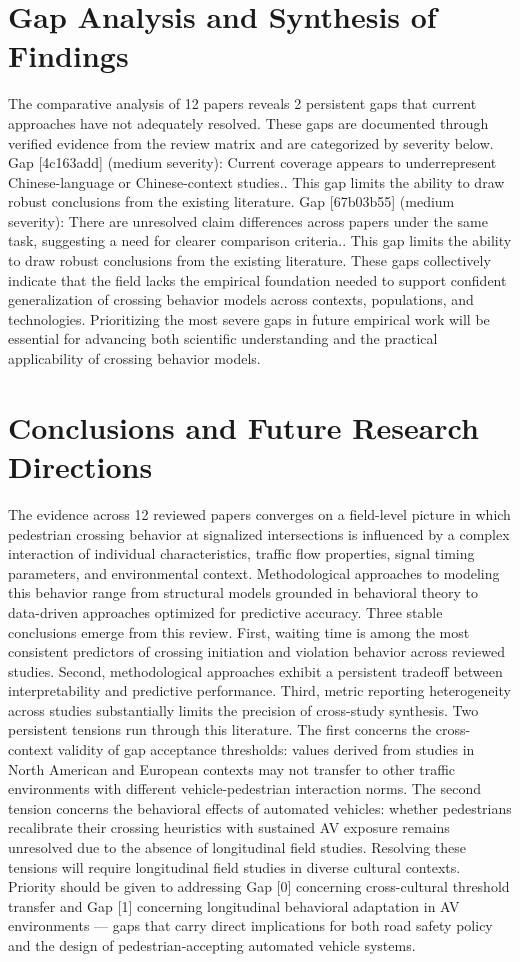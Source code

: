 \documentclass{article}
\begin{document}
\section{Gap Analysis and Synthesis of Findings}
The comparative analysis of 12 papers reveals 2 persistent gaps that current approaches have not adequately resolved. These gaps are documented through verified evidence from the review matrix and are categorized by severity below. Gap [4c163add] (medium severity): Current coverage appears to underrepresent Chinese-language or Chinese-context studies.. This gap limits the ability to draw robust conclusions from the existing literature. Gap [67b03b55] (medium severity): There are unresolved claim differences across papers under the same task, suggesting a need for clearer comparison criteria.. This gap limits the ability to draw robust conclusions from the existing literature. These gaps collectively indicate that the field lacks the empirical foundation needed to support confident generalization of crossing behavior models across contexts, populations, and technologies. Prioritizing the most severe gaps in future empirical work will be essential for advancing both scientific understanding and the practical applicability of crossing behavior models.

\section{Conclusions and Future Research Directions}
The evidence across 12 reviewed papers converges on a field-level picture in which pedestrian crossing behavior at signalized intersections is influenced by a complex interaction of individual characteristics, traffic flow properties, signal timing parameters, and environmental context. Methodological approaches to modeling this behavior range from structural models grounded in behavioral theory to data-driven approaches optimized for predictive accuracy. Three stable conclusions emerge from this review. First, waiting time is among the most consistent predictors of crossing initiation and violation behavior across reviewed studies. Second, methodological approaches exhibit a persistent tradeoff between interpretability and predictive performance. Third, metric reporting heterogeneity across studies substantially limits the precision of cross-study synthesis. Two persistent tensions run through this literature. The first concerns the cross-context validity of gap acceptance thresholds: values derived from studies in North American and European contexts may not transfer to other traffic environments with different vehicle-pedestrian interaction norms. The second tension concerns the behavioral effects of automated vehicles: whether pedestrians recalibrate their crossing heuristics with sustained AV exposure remains unresolved due to the absence of longitudinal field studies. Resolving these tensions will require longitudinal field studies in diverse cultural contexts. Priority should be given to addressing Gap [0] concerning cross-cultural threshold transfer and Gap [1] concerning longitudinal behavioral adaptation in AV environments — gaps that carry direct implications for both road safety policy and the design of pedestrian-accepting automated vehicle systems.
\end{document}
